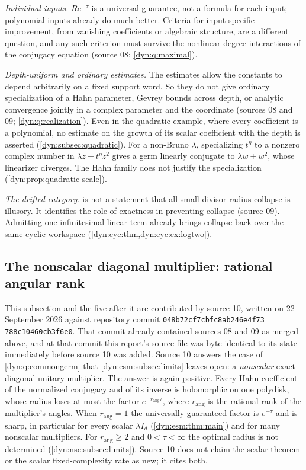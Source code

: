 \documentclass[11pt,letterpaper]{article}
\theoremstyle{definition}
\theoremstyle{remark}
\newcommand{\rang}{r_{\mathrm{ang}}}
\numberwithin{equation}{section}
\begin{document}
\emph{Individual inputs.} $Re^{-\tau}$ is a universal guarantee, not a
formula for each input; polynomial inputs already do much better. Criteria
for input-specific improvement, from vanishing coefficients or algebraic
structure, are a different question, and any such criterion must survive the
nonlinear degree interactions of the conjugacy equation (source 08;
\cref{dyn:q:maximal}).

\emph{Depth-uniform and ordinary estimates.} The estimates allow the
constants to depend arbitrarily on a fixed support word. So they do not give
ordinary specialization of a Hahn parameter, Gevrey bounds across depth, or
analytic convergence jointly in a complex parameter and the coordinate
(sources 08 and 09; \cref{dyn:q:realization}). Even in the quadratic example,
where every coefficient is a polynomial, no estimate on the growth of its
scalar coefficient with the depth is asserted
(\cref{dyn:subsec:quadratic}). For a non-Bruno $\lambda$, specializing
$t^{\eta}$ to a nonzero complex number in $\lambda z+t^{\eta}z^{2}$ gives a
germ linearly conjugate to $\lambda w+w^{2}$, whose linearizer diverges. The
Hahn family does not justify the specialization
(\cref{dyn:prop:quadratic-scale}).

\emph{The drifted category.}  is not a statement
that all small-divisor radius collapse is illusory. It identifies the role
of exactness in preventing collapse (source 09). Admitting one infinitesimal
linear term already brings collapse back over the same cyclic workspace
(\cref{dyn:cyc:thm,dyn:cyc:ex:logtwo}).

\subsection{The nonscalar diagonal multiplier: rational angular rank}
\label{dyn:nsc:subsec}

This subsection and the five after it are contributed by source 10, written
on 22 September 2026 against repository commit
\texttt{048b72cf\allowbreak 7cbfc8ab\allowbreak 246e4f73\allowbreak
788c1046\allowbreak 0cb3f6e0}. That commit already contained sources 08 and
09 as merged above, and at that commit this report's source file was
byte-identical to its state immediately before source 10 was added. Source
10 answers the case of \cref{dyn:q:commongerm} that
\cref{dyn:esm:subsec:limits} leaves open: a \emph{nonscalar} exact diagonal
unitary multiplier. The answer is again positive. Every Hahn coefficient of
the normalized conjugacy and of its inverse is holomorphic on one polydisk,
whose radius loses at most the factor $e^{-\rang\tau}$, where $\rang$ is the
rational rank of the multiplier's angles. When $\rang=1$ the universally
guaranteed factor is $e^{-\tau}$ and is sharp, in particular for every scalar $\lambda I_d$
(\cref{dyn:esm:thm:main}) and for many nonscalar multipliers. For
$\rang\ge2$ and $0<\tau<\infty$ the optimal radius is not determined
(\cref{dyn:nsc:subsec:limits}). Source 10 does not claim the scalar theorem
or the scalar fixed-complexity rate as new; it cites both.
\end{document}
